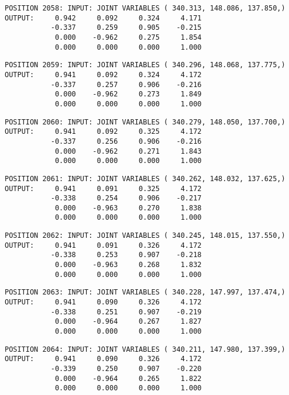 \begin{verbatim}
POSITION 2058: INPUT: JOINT VARIABLES ( 340.313, 148.086, 137.850,)
OUTPUT:     0.942     0.092     0.324     4.171
           -0.337     0.259     0.905    -0.215
            0.000    -0.962     0.275     1.854
            0.000     0.000     0.000     1.000
\end{verbatim} \pagebreak[1]\begin{verbatim}
POSITION 2059: INPUT: JOINT VARIABLES ( 340.296, 148.068, 137.775,)
OUTPUT:     0.941     0.092     0.324     4.172
           -0.337     0.257     0.906    -0.216
            0.000    -0.962     0.273     1.849
            0.000     0.000     0.000     1.000
\end{verbatim} \pagebreak[1]\begin{verbatim}
POSITION 2060: INPUT: JOINT VARIABLES ( 340.279, 148.050, 137.700,)
OUTPUT:     0.941     0.092     0.325     4.172
           -0.337     0.256     0.906    -0.216
            0.000    -0.962     0.271     1.843
            0.000     0.000     0.000     1.000
\end{verbatim} \pagebreak[1]\begin{verbatim}
POSITION 2061: INPUT: JOINT VARIABLES ( 340.262, 148.032, 137.625,)
OUTPUT:     0.941     0.091     0.325     4.172
           -0.338     0.254     0.906    -0.217
            0.000    -0.963     0.270     1.838
            0.000     0.000     0.000     1.000
\end{verbatim} \pagebreak[1]\begin{verbatim}
POSITION 2062: INPUT: JOINT VARIABLES ( 340.245, 148.015, 137.550,)
OUTPUT:     0.941     0.091     0.326     4.172
           -0.338     0.253     0.907    -0.218
            0.000    -0.963     0.268     1.832
            0.000     0.000     0.000     1.000
\end{verbatim} \pagebreak[1]\begin{verbatim}
POSITION 2063: INPUT: JOINT VARIABLES ( 340.228, 147.997, 137.474,)
OUTPUT:     0.941     0.090     0.326     4.172
           -0.338     0.251     0.907    -0.219
            0.000    -0.964     0.267     1.827
            0.000     0.000     0.000     1.000
\end{verbatim} \pagebreak[1]\begin{verbatim}
POSITION 2064: INPUT: JOINT VARIABLES ( 340.211, 147.980, 137.399,)
OUTPUT:     0.941     0.090     0.326     4.172
           -0.339     0.250     0.907    -0.220
            0.000    -0.964     0.265     1.822
            0.000     0.000     0.000     1.000
\end{verbatim} \pagebreak[1]\begin{verbatim}

\end{verbatim}
